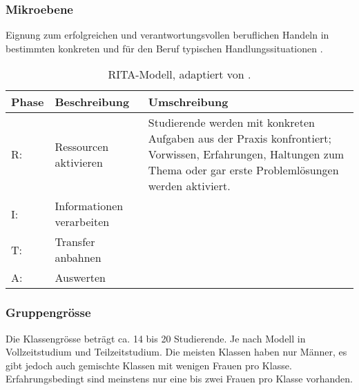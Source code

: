 \documentclass[
11pt,
captions=tableheading,
smallheadings,
headsepline,
footsepline, 
captions=tableheading,
parskip=half-,
]{scrartcl}
\begin{document}
\subsubsection{Mikroebene}
Eignung zum erfolgreichen und verantwortungsvollen beruflichen Handeln in bestimmten konkreten und für den Beruf typischen Handlungssituationen \cite{BerufspädagogischesKonzept_BauschuleAarau}.


\begin{table}[H]
    \centering
    \label{tab:RITA_Modell}
    \caption{RITA-Modell, adaptiert von \cite{BerufspädagogischesKonzept_BauschuleAarau}.}
    \begin{tabularx}{\textwidth}{@{}llp{9.5cm}@{}}
        \toprule
        \textbf{Phase} & \textbf{Beschreibung}     & \textbf{Umschreibung}                                                                                                                                               \\
        \midrule
        R:             & Ressourcen aktivieren     & Studierende werden mit konkreten Aufgaben aus der Praxis konfrontiert; Vorwissen, Erfahrungen, Haltungen zum Thema oder gar erste Problemlösungen werden aktiviert. \\
        I:             & Informationen verarbeiten & {}                                                                                                                                                                  \\
        T:             & Transfer anbahnen         & {}                                                                                                                                                                  \\
        A:             & Auswerten                 & {}                                                                                                                                                                  \\
        \bottomrule
    \end{tabularx}
\end{table}

\subsubsection{Gruppengrösse}
Die Klassengrösse beträgt ca. 14 bis 20 Studierende.
Je nach Modell in Vollzeitstudium und Teilzeitstudium.
Die meisten Klassen haben nur Männer, es gibt jedoch auch gemischte Klassen mit wenigen Frauen pro Klasse. Erfahrungsbedingt sind meinstens nur eine bis zwei Frauen pro Klasse vorhanden.
\end{document}

